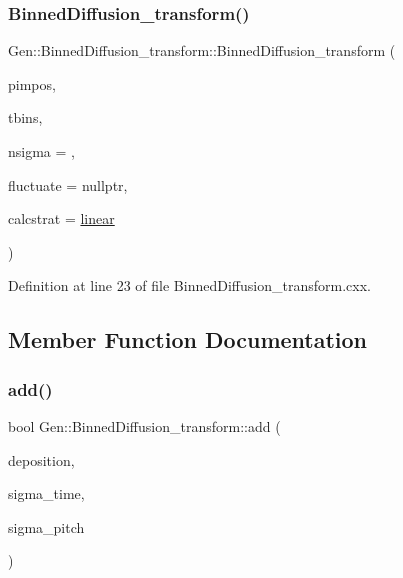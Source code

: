 \subsubsection{\texorpdfstring{Binned\+Diffusion\+\_\+transform()}{BinnedDiffusion\_transform()}}
{\footnotesize\ttfamily Gen\+::\+Binned\+Diffusion\+\_\+transform\+::\+Binned\+Diffusion\+\_\+transform (\begin{DoxyParamCaption}\item[{const \hyperlink{class_wire_cell_1_1_pimpos}{Pimpos} \&}]{pimpos,  }\item[{const \hyperlink{class_wire_cell_1_1_binning}{Binning} \&}]{tbins,  }\item[{double}]{nsigma = {},  }\item[{\hyperlink{class_wire_cell_1_1_interface_a09c548fb8266cfa39afb2e74a4615c37}{I\+Random\+::pointer}}]{fluctuate = {\ttfamily nullptr},  }\item[{\hyperlink{class_wire_cell_1_1_gen_1_1_binned_diffusion__transform_af412f1b73b13a90b066cb7284735ddf8}{Impact\+Data\+Calculation\+Strategy}}]{calcstrat = {\ttfamily \hyperlink{class_wire_cell_1_1_gen_1_1_binned_diffusion__transform_af412f1b73b13a90b066cb7284735ddf8aaac1a1f642137ad29456e098e82c7b6e}{linear}} }\end{DoxyParamCaption})}



Definition at line 23 of file Binned\+Diffusion\+\_\+transform.\+cxx.



\subsection{Member Function Documentation}
\mbox{\label{class_wire_cell_1_1_gen_1_1_binned_diffusion__transform_a18fd9a41fa313057caf57a8aa9957c86}} 
\subsubsection{\texorpdfstring{add()}{add()}}
{\footnotesize\ttfamily bool Gen\+::\+Binned\+Diffusion\+\_\+transform\+::add (\begin{DoxyParamCaption}\item[{\hyperlink{class_wire_cell_1_1_i_data_aff870b3ae8333cf9265941eef62498bc}{I\+Depo\+::pointer}}]{deposition,  }\item[{double}]{sigma\+\_\+time,  }\item[{double}]{sigma\+\_\+pitch }\end{DoxyParamCaption})}

